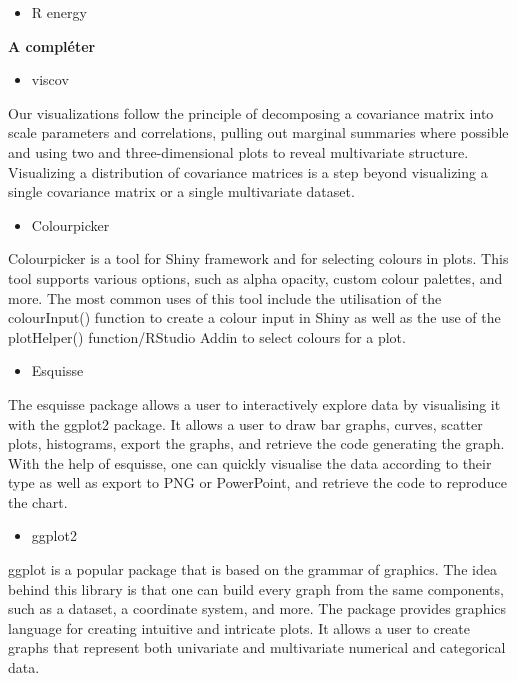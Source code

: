 \documentclass[
]{report}
\providecommand{\tightlist}{%
  \setlength{\itemsep}{0pt}\setlength{\parskip}{0pt}}
\begin{document}
\begin{itemize}
\tightlist
\item
  R energy
\end{itemize}

\textbf{A compléter}

\begin{itemize}
\tightlist
\item
  viscov
\end{itemize}

Our visualizations follow the principle of decomposing a covariance matrix into scale parameters and correlations, pulling out marginal summaries where possible and using two and three-dimensional plots to reveal multivariate structure. Visualizing a distribution of covariance matrices is a step beyond visualizing a single covariance matrix or a single multivariate dataset.

\begin{itemize}
\tightlist
\item
  Colourpicker
\end{itemize}

Colourpicker is a tool for Shiny framework and for selecting colours in plots. This tool supports various options, such as alpha opacity, custom colour palettes, and more. The most common uses of this tool include the utilisation of the colourInput() function to create a colour input in Shiny as well as the use of the plotHelper() function/RStudio Addin to select colours for a plot.

\begin{itemize}
\tightlist
\item
  Esquisse
\end{itemize}

The esquisse package allows a user to interactively explore data by visualising it with the ggplot2 package. It allows a user to draw bar graphs, curves, scatter plots, histograms, export the graphs, and retrieve the code generating the graph. With the help of esquisse, one can quickly visualise the data according to their type as well as export to PNG or PowerPoint, and retrieve the code to reproduce the chart.

\begin{itemize}
\tightlist
\item
  ggplot2
\end{itemize}

ggplot is a popular package that is based on the grammar of graphics. The idea behind this library is that one can build every graph from the same components, such as a dataset, a coordinate system, and more. The package provides graphics language for creating intuitive and intricate plots. It allows a user to create graphs that represent both univariate and multivariate numerical and categorical data.
\end{document}
